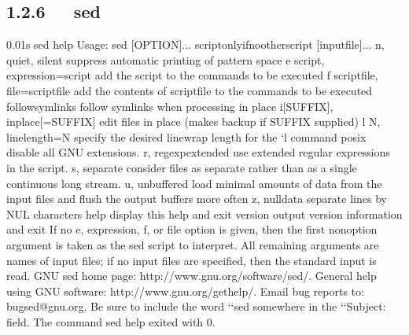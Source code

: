 \documentclass[letterpaper,12pt,english]{sphinxmanual}
\begin{document}
\subsection{1.2.6   sed}
\label{\detokenize{001software/001install/linux:sed}}
\begin{sphinxVerbatim}[commandchars=\\\{\}]
0.01s\PYGZdl{} sed \PYGZhy{}\PYGZhy{}help
Usage: sed [OPTION]... \PYGZob{}script\PYGZhy{}only\PYGZhy{}if\PYGZhy{}no\PYGZhy{}other\PYGZhy{}script\PYGZcb{} [input\PYGZhy{}file]...
  \PYGZhy{}n, \PYGZhy{}\PYGZhy{}quiet, \PYGZhy{}\PYGZhy{}silent
                 suppress automatic printing of pattern space
  \PYGZhy{}e script, \PYGZhy{}\PYGZhy{}expression=script
                 add the script to the commands to be executed
  \PYGZhy{}f script\PYGZhy{}file, \PYGZhy{}\PYGZhy{}file=script\PYGZhy{}file
                 add the contents of script\PYGZhy{}file to the commands to be executed
  \PYGZhy{}\PYGZhy{}follow\PYGZhy{}symlinks
                 follow symlinks when processing in place
  \PYGZhy{}i[SUFFIX], \PYGZhy{}\PYGZhy{}in\PYGZhy{}place[=SUFFIX]
                 edit files in place (makes backup if SUFFIX supplied)
  \PYGZhy{}l N, \PYGZhy{}\PYGZhy{}line\PYGZhy{}length=N
                 specify the desired line\PYGZhy{}wrap length for the {}`l\PYGZsq{} command
  \PYGZhy{}\PYGZhy{}posix
                 disable all GNU extensions.
  \PYGZhy{}r, \PYGZhy{}\PYGZhy{}regexp\PYGZhy{}extended
                 use extended regular expressions in the script.
  \PYGZhy{}s, \PYGZhy{}\PYGZhy{}separate
                 consider files as separate rather than as a single continuous
                 long stream.
  \PYGZhy{}u, \PYGZhy{}\PYGZhy{}unbuffered
                 load minimal amounts of data from the input files and flush
                 the output buffers more often
  \PYGZhy{}z, \PYGZhy{}\PYGZhy{}null\PYGZhy{}data
                 separate lines by NUL characters
      \PYGZhy{}\PYGZhy{}help     display this help and exit
      \PYGZhy{}\PYGZhy{}version  output version information and exit
If no \PYGZhy{}e, \PYGZhy{}\PYGZhy{}expression, \PYGZhy{}f, or \PYGZhy{}\PYGZhy{}file option is given, then the first
non\PYGZhy{}option argument is taken as the sed script to interpret.  All
remaining arguments are names of input files; if no input files are
specified, then the standard input is read.
GNU sed home page: \PYGZlt{}http://www.gnu.org/software/sed/\PYGZgt{}.
General help using GNU software: \PYGZlt{}http://www.gnu.org/gethelp/\PYGZgt{}.
E\PYGZhy{}mail bug reports to: \PYGZlt{}bug\PYGZhy{}sed@gnu.org\PYGZgt{}.
Be sure to include the word {}`{}`sed\PYGZsq{}\PYGZsq{} somewhere in the {}`{}`Subject:\PYGZsq{}\PYGZsq{} field.
The command \PYGZdq{}sed \PYGZhy{}\PYGZhy{}help\PYGZdq{} exited with 0.
\end{sphinxVerbatim}
\end{document}
